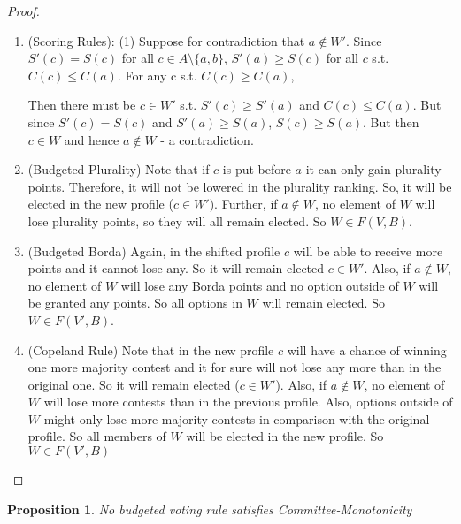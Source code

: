 \documentclass{article}
\newtheorem{mytheorem}{Proposition}
\begin{document}
\begin{proof}
\begin{enumerate}
\item (Scoring Rules): (1) Suppose for contradiction that $a\notin W'$. Since $S'(c)=S(c)$ for all $c\in A\setminus\{a,b\}$, $S'(a)\geq S(c)$ for all $c$ s.t. $C(c)\leq C(a)$. For any c s.t. $C(c)\geq C(a)$,

Then there must be $c\in W'$ s.t. $S'(c)\geq S'(a)$ and $C(c)\leq C(a)$. But since $S'(c)=S(c)$ and $S'(a)\geq S(a)$, $S(c)\geq S(a)$. But then $c\in W$ and hence $a\notin W$ - a contradiction.

\item (Budgeted Plurality)
Note that if $c$ is put before $a$ it can only gain plurality points. Therefore, it will not be lowered in the plurality ranking. So, it will be elected in the new profile ($c \in W'$). Further, if $a \notin W$, no element of $W$ will lose plurality points, so they will all remain elected. So $W \in F(V,B)$.
\item (Budgeted Borda)
Again, in the shifted profile $c$ will be able to receive more points and it cannot lose any. So it will remain elected $c \in W'$. Also, if $a \notin W$, no element of $W$ will lose any Borda points and no option outside of $W$ will be granted any points. So all options in $W$ will remain elected. So $W \in F(V',B)$.
\item (Copeland Rule)
Note that in the new profile $c$ will have a chance of winning one more majority contest and it for sure will not lose any more than in the original one. So it will remain elected ($c \in W'$). Also, if $a \notin W$, no element of $W$ will lose more contests than in the previous profile. Also, options outside of $W$ might only lose more majority contests in comparison with the original profile. So all members of $W$ will be elected in the new profile. So $W \in F(V',B)$

\end{enumerate}

\end{proof}
\begin{mytheorem}
No budgeted voting rule satisfies Committee-Monotonicity
\end{mytheorem}
\end{document}
